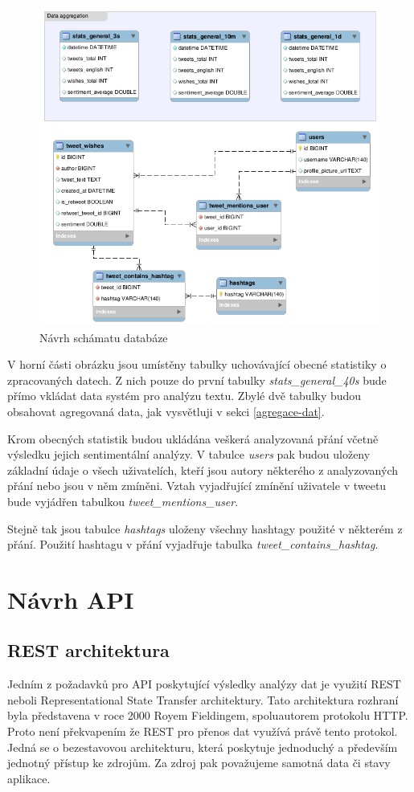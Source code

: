 \documentclass[thesis=B,czech]{FITthesis}[2012/06/26]
\begin{document}
\begin{figure}[ht]
   	\centering
   	\includegraphics[width=1\textwidth]{../db_model.png}
   	\caption{Návrh schámatu databáze}
   	\label{fig:db-structure}
\end{figure}

V horní části obrázku jsou umístěny tabulky uchovávající obecné statistiky o zpracovaných datech. Z nich pouze do první tabulky \textit{stats\_general\_40s} bude přímo vkládat data systém pro analýzu textu. Zbylé dvě tabulky budou obsahovat agregovaná data, jak vysvětluji v sekci \ref{agregace-dat}. 

Krom obecných statistik budou ukládána veškerá analyzovaná přání včetně výsledku jejich sentimentální analýzy. V tabulce \textit{users} pak budou uloženy základní údaje o všech uživatelích, kteří jsou autory některého z analyzovaných přání nebo jsou v něm zmíněni. Vztah vyjadřující zmínění uživatele v tweetu bude vyjádřen tabulkou \textit{tweet\_mentions\_user}. 

Stejně tak jsou tabulce \textit{hashtags} uloženy všechny hashtagy použité v některém z přání. Použití hashtagu v přání vyjadřuje tabulka \textit{tweet\_contains\_hashtag}.

\section{Návrh API}
\label{rest}
\subsection{REST architektura}
	Jedním z požadavků pro API poskytující výsledky analýzy dat je využití REST neboli Representational State Transfer architektury. Tato architektura rozhraní byla představena v roce 2000 Royem Fieldingem, spoluautorem protokolu HTTP\cite{jjjlkll}. Proto není překvapením že REST pro přenos dat využívá právě tento protokol. Jedná se o bezestavovou architekturu, která poskytuje jednoduchý a především jednotný přístup ke zdrojům. Za zdroj pak považujeme samotná data či stavy aplikace. 
	
\end{document}
